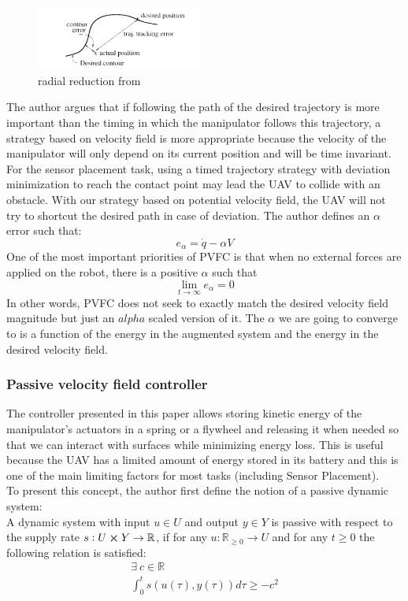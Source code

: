 \begin{figure}[h!]
    \centering
    \includegraphics[width=0.48\textwidth]{Images/radialreduction.png}
    \caption{radial reduction from \cite{li1999passive}}
    \label{fig:radialreduction}
\end{figure} 
The author argues that if following the path of the desired trajectory is more important than the timing in which the manipulator follows this trajectory, a strategy based on velocity field is more appropriate because the velocity of the manipulator will only depend on its current position and will be time invariant.  
For the sensor placement task, using a timed trajectory strategy with deviation minimization to reach the contact point may lead the UAV to collide with an obstacle. With our strategy based on potential velocity field, the UAV will not try to shortcut the desired path in case of deviation.
The author defines an $\alpha$ error such that:
\begin{equation}
    e_{\alpha} = \dot{q} - \alpha V
\end{equation}
One of the most important priorities of PVFC is that when no external forces are applied on the robot, there is a positive $\alpha$ such that 
\begin{equation}
    \lim_{t\to\infty}e_{\alpha} = 0
\end{equation}
In other words, PVFC does not seek to exactly match the desired velocity field magnitude but just an $alpha$ scaled version of it. The $\alpha$ we are going to converge to is a function of the energy in the augmented system and the energy in the desired velocity field.
\subsubsection{Passive velocity field controller}
The controller presented in this paper allows storing kinetic energy of the manipulator's actuators in a spring or a flywheel and releasing it when needed so that we can interact with surfaces while minimizing energy loss. This is useful because the UAV has a limited amount of energy stored in its battery and this is one of the main limiting factors for most tasks (including Sensor Placement). \\
To present this concept, the author first define the notion of a passive dynamic system:\\
A dynamic system with input $u \in U$ and output $y \in Y$ is passive with respect to the supply rate 
$s:U \cross Y \rightarrow \mathbb R$, if for any $u: \mathbb R_{\ge 0} \rightarrow U $ and for any $t\geq 0$ the following relation is satisfied:
\begin{align}
    \exists ~ c\in\mathbb R  \nonumber\\
    \int_{0}^{t}s(u(\tau),y(\tau))d\tau \geq -c^2 \label{passivityCondition}
\end{align}

